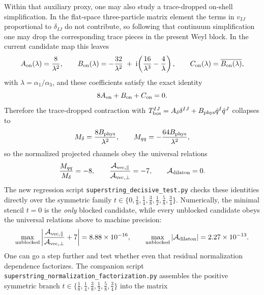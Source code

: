 \documentclass[11pt]{article}
\numberwithin{equation}{section}
\newcommand{\ii}{\mathrm{i}}
\begin{document}
Within that auxiliary proxy, one may also study a trace-dropped on-shell
simplification. In the flat-space three-particle matrix element the terms in
$v_{IJ}$ proportional to $\delta_{IJ}$ do not contribute, so following that
continuum simplification one may drop the corresponding trace pieces in the
present Weyl block. In the current candidate map this leaves
\begin{equation}
\label{eq:s15-1-042}
A_{\rm on}(\lambda)=\frac{8}{\lambda^2},
\qquad
B_{\rm on}(\lambda)= -\frac{32}{\lambda^2}
\;+\;\ii\!\left(\frac{16}{\lambda^3}-\frac{4}{\lambda}\right),
\qquad
C_{\rm on}(\lambda)=\overline{B_{\rm on}(\lambda)},
\end{equation}
with $\lambda=\alpha_1/\alpha_3$, and these coefficients satisfy the exact identity
\begin{equation}
\label{eq:s15-1-043}
8A_{\rm on}+B_{\rm on}+C_{\rm on}=0.
\end{equation}
Therefore the trace-dropped contraction with
\(
T^{IJ}_{\rm bos}=A_\delta \delta^{IJ}+B_{\rm phys}\hat q^I\hat q^J
\)
collapses to
\begin{equation}
\label{eq:s15-1-044}
M_\delta=\frac{8B_{\rm phys}}{\lambda^2},
\qquad
M_{qq}=-\frac{64B_{\rm phys}}{\lambda^2},
\end{equation}
so the normalized projected channels obey the universal relations
\begin{equation}
\label{eq:s15-1-045}
\frac{M_{qq}}{M_\delta}=-8,
\qquad
\frac{{\cal A}_{\rm vec,\parallel}}{{\cal A}_{\rm vec,\perp}}=-7,
\qquad
{\cal A}_{\rm dilaton}=0.
\end{equation}
The new regression script \texttt{superstring\_decisive\_test.py} checks these identities directly over the symmetric family $t\in\{0,\frac18,\frac14,\frac38,\frac12,\frac58,\frac34\}$. Numerically, the minimal stencil $t=0$ is the \emph{only} blocked candidate, while every unblocked candidate obeys the universal relations above to machine precision:
\begin{equation}
\label{eq:s15-1-046}
\max_{\rm unblocked}\left|\frac{{\cal A}_{\rm vec,\parallel}}{{\cal A}_{\rm vec,\perp}}+7\right|
=8.88\times 10^{-16},
\qquad
\max_{\rm unblocked}|{\cal A}_{\rm dilaton}|
=2.27\times 10^{-13}.
\end{equation}
One can go a step further and test whether even that residual normalization dependence factorizes. The companion script \texttt{superstring\_normalization\_factorization.py} assembles the positive symmetric branch $t\in\{\frac18,\frac14,\frac38,\frac12,\frac58,\frac34\}$ into the matrix
\end{document}
